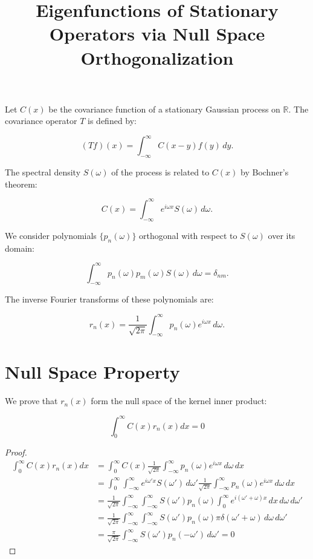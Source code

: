 \documentclass{article}
\begin{document}
\title{Eigenfunctions of Stationary Operators via Null Space Orthogonalization}
\maketitle

Let $C(x)$ be the covariance function of a stationary Gaussian process on $\mathbb{R}$. The covariance operator $T$ is defined by:

$$(Tf)(x) = \int_{-\infty}^\infty C(x-y) f(y) \, dy.$$

The spectral density $S(\omega)$ of the process is related to $C(x)$ by Bochner's theorem:

$$C(x) = \int_{-\infty}^{\infty} e^{i\omega x} S(\omega) \, d\omega.$$

We consider polynomials $\{p_n(\omega)\}$ orthogonal with respect to $S(\omega)$ over its domain:

$$\int_{-\infty}^{\infty} p_n(\omega) p_m(\omega) S(\omega) \, d\omega = \delta_{nm}.$$

The inverse Fourier transforms of these polynomials are:

$$r_n(x) = \frac{1}{\sqrt{2\pi}} \int_{-\infty}^{\infty} p_n(\omega) e^{i\omega x} \, d\omega.$$

\section{Null Space Property}

We prove that $r_n(x)$ form the null space of the kernel inner product:

$$\int_0^\infty C(x)r_n(x)dx = 0$$

\begin{proof}
\begin{align*}
\int_0^\infty C(x)r_n(x)dx &= \int_0^\infty C(x) \frac{1}{\sqrt{2\pi}} \int_{-\infty}^{\infty} p_n(\omega) e^{i\omega x} \, d\omega \, dx \\
&= \int_0^\infty \int_{-\infty}^{\infty} e^{i\omega' x} S(\omega') \, d\omega' \frac{1}{\sqrt{2\pi}} \int_{-\infty}^{\infty} p_n(\omega) e^{i\omega x} \, d\omega \, dx \\
&= \frac{1}{\sqrt{2\pi}} \int_{-\infty}^{\infty} \int_{-\infty}^{\infty} S(\omega') p_n(\omega) \int_0^\infty e^{i(\omega'+\omega) x} \, dx \, d\omega \, d\omega' \\
&= \frac{1}{\sqrt{2\pi}} \int_{-\infty}^{\infty} \int_{-\infty}^{\infty} S(\omega') p_n(\omega) \pi \delta(\omega'+\omega) \, d\omega \, d\omega' \\
&= \frac{\pi}{\sqrt{2\pi}} \int_{-\infty}^{\infty} S(\omega') p_n(-\omega') \, d\omega' = 0
\end{align*}
\end{proof}
\end{document}
